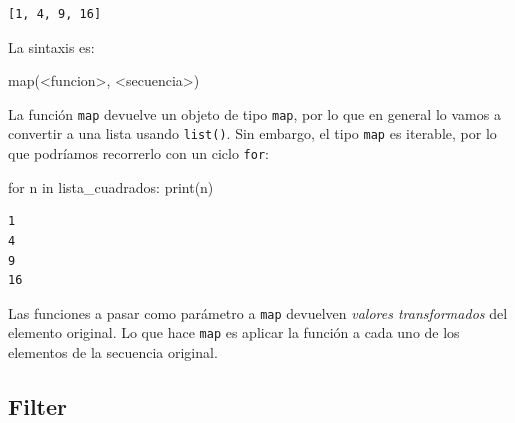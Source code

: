 \documentclass[
  letterpaper,
  DIV=11,
  numbers=noendperiod]{scrreprt}
\newenvironment{Shaded}{\begin{snugshade}}{\end{snugshade}}
\newcommand{\BuiltInTok}[1]{\textcolor[rgb]{0.00,0.23,0.31}{#1}}
\newcommand{\ControlFlowTok}[1]{\textcolor[rgb]{0.00,0.23,0.31}{#1}}
\newcommand{\KeywordTok}[1]{\textcolor[rgb]{0.00,0.23,0.31}{#1}}
\newcommand{\NormalTok}[1]{\textcolor[rgb]{0.00,0.23,0.31}{#1}}
\newcommand{\OperatorTok}[1]{\textcolor[rgb]{0.37,0.37,0.37}{#1}}
\begin{document}
\begin{verbatim}
[1, 4, 9, 16]
\end{verbatim}

La sintaxis es:

\begin{Shaded}
\begin{Highlighting}[]
\BuiltInTok{map}\NormalTok{(}\OperatorTok{\textless{}}\NormalTok{funcion}\OperatorTok{\textgreater{}}\NormalTok{, }\OperatorTok{\textless{}}\NormalTok{secuencia}\OperatorTok{\textgreater{}}\NormalTok{)}
\end{Highlighting}
\end{Shaded}

La función \texttt{map} devuelve un objeto de tipo \texttt{map}, por lo
que en general lo vamos a convertir a una lista usando \texttt{list()}.
Sin embargo, el tipo \texttt{map} es iterable, por lo que podríamos
recorrerlo con un ciclo \texttt{for}:

\begin{Shaded}
\begin{Highlighting}[]
\ControlFlowTok{for}\NormalTok{ n }\KeywordTok{in}\NormalTok{ lista\_cuadrados:}
  \BuiltInTok{print}\NormalTok{(n)}
\end{Highlighting}
\end{Shaded}

\begin{verbatim}
1
4
9
16
\end{verbatim}

\begin{tcolorbox}[enhanced jigsaw, bottomrule=.15mm, leftrule=.75mm, opacityback=0, colback=white, toprule=.15mm, bottomtitle=1mm, opacitybacktitle=0.6, rightrule=.15mm, left=2mm, arc=.35mm, coltitle=black, title=\textcolor{quarto-callout-tip-color}{\faLightbulb}\hspace{0.5em}{Tip}, breakable, toptitle=1mm, colframe=quarto-callout-tip-color-frame, titlerule=0mm, colbacktitle=quarto-callout-tip-color!10!white]

Las funciones a pasar como parámetro a \texttt{map} devuelven
\emph{valores transformados} del elemento original. Lo que hace
\texttt{map} es aplicar la función a cada uno de los elementos de la
secuencia original.

\end{tcolorbox}

\subsection{Filter}\label{filter}
\end{document}
